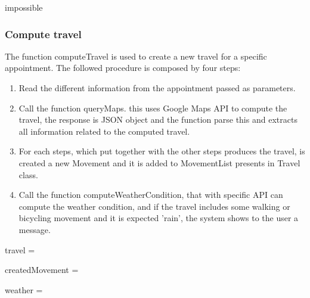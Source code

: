 \begin{algorithmic}
			\State {}
			\State \Return impossible
			\State {}
		\Else
			\State \Return {}
		\EndIf
	\EndFunction
	
\end{algorithmic}

\subsubsection{Compute travel}
\label{subsec:algComputeTravel}
The function computeTravel is used to create a new travel for a specific appointment.
The followed procedure is composed by four steps:
\begin{enumerate}
	\item Read the different information from the appointment passed as parameters.
	\item Call the function queryMaps. this uses Google Maps API to compute the travel, the response is JSON object and the function parse this and extracts all information related to the computed travel.
	\item For each steps, which put together with the other steps produces the travel, is created a new Movement and it is added to MovementList presents in Travel class.
	\item Call the function computeWeatherCondition, that with specific API can compute the weather condition, and if the travel includes some walking or bicycling movement and it is expected 'rain', the system shows to the user a message.
\end{enumerate}

\begin{algorithmic}
		
		\State {}
		\State {}
		
		\State travel =  
		
			\State createdMovement = 
			\State {}
		\EndFor
		
		\State {}
		\State {}
		
		weather = 
			\State {}
		\EndIf
	\EndFunction
\end{algorithmic}


